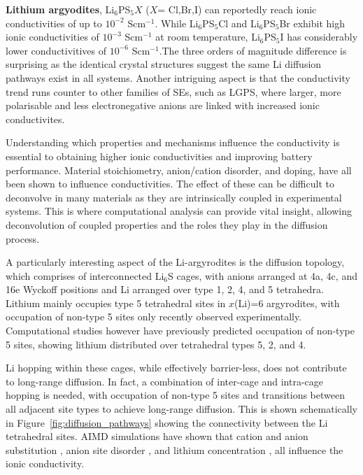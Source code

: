 \documentclass[../main.tex]{subfiles}
\begin{document}
\textbf{Lithium argyodites}, Li$_6$PS$_{5}X$ ($X$= Cl,Br,I) can reportedly reach ionic conductivities of up to $10^{-2}$ Scm$^{-1}$. \cite{deiseroth_li6ps5x_2008} While Li$_6$PS$_{5}$Cl and Li$_6$PS$_{5}$Br exhibit high ionic conductivities of $10^{-3}$ Scm$^{-1}$ at room temperature, Li$_6$PS$_{5}$I has considerably lower conductivitives of $10^{-6}$ Scm$^{-1}$.The three orders of magnitude difference is surprising as the identical crystal structures suggest the same Li diffusion pathways exist in all systems. Another intriguing aspect is that the conductivity trend runs counter to other families of SEs, such as LGPS, where larger, more polarisable and less electronegative anions are linked with increased ionic conductivites. \cite{bachman2016inorganic}

Understanding which properties and mechanisms influence the conductivity is essential to obtaining higher ionic conductivities and improving battery performance. Material stoichiometry, anion/cation disorder, and doping, have all been shown to influence conductivities. The effect of these can be difficult to deconvolve in many materials as they are intrinsically coupled in experimental systems. This is where computational analysis can provide vital insight, allowing deconvolution of coupled properties and the roles they play in the diffusion process.

A particularly interesting aspect of the Li-argyrodites is the diffusion topology, which comprises of interconnected Li$_6$S cages, with anions arranged at 4a, 4c, and 16e Wyckoff positions and Li arranged over type 1, 2, 4, and 5 tetrahedra.\cite{kuhs1979} Lithium mainly occupies type 5 tetrahedral sites in $x$(Li)=6 argyrodites, with occupation of non-type 5 sites only recently observed experimentally. \cite{ohno2019further,gautamengineering} Computational studies however have previously predicted occupation of non-type 5 sites, showing lithium distributed over tetrahedral types 5, 2, and 4. \cite{deiseroth_li6ps5x_2008, Minafra2020, morgan2020mechanistic}

Li hopping within these cages, while effectively barrier-less, does not contribute to long-range diffusion. In fact, a combination of inter-cage and intra-cage hopping is needed, with occupation of non-type 5 sites and transitions between all adjacent site types to achieve long-range diffusion. This is shown schematically in Figure~\ref{fig:diffusion_pathways} showing the connectivity between the Li tetrahedral sites. AIMD simulations have shown that cation and anion substitution \cite{ohno2019further,deklerk2016}, anion site disorder \cite{gautamengineering,morgan2020mechanistic}, and lithium concentration \cite{Deng2017, yu_superionic_2020, Feng_2020}, all influence the ionic conductivity.
\end{document}
